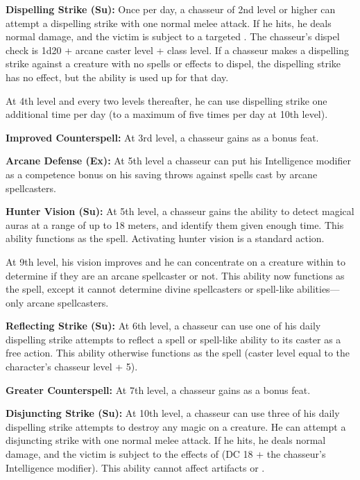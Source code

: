 {%


\textbf{Dispelling Strike (Su):} Once per day, a chasseur of 2nd level or higher can attempt a dispelling strike with one normal melee attack. If he hits, he deals normal damage, and the victim is subject to a targeted . The chasseur's dispel check is 1d20 + arcane caster level + class level. If a chasseur makes a dispelling strike against a creature with no spells or effects to dispel, the dispelling strike has no effect, but the ability is used up for that day.

At 4th level and every two levels thereafter, he can use dispelling strike one additional time per day (to a maximum of five times per day at 10th level).

\textbf{Improved Counterspell:} At 3rd level, a chasseur gains  as a bonus feat.

\textbf{Arcane Defense (Ex):} At 5th level a chasseur can put his Intelligence modifier as a competence bonus on his saving throws against spells cast by arcane spellcasters.

\textbf{Hunter Vision (Su):} At 5th level, a chasseur gains the ability to detect magical auras at a range of up to 18 meters, and identify them given enough time. This ability functions as the  spell. Activating hunter vision is a standard action.

At 9th level, his vision improves and he can concentrate on a creature within to determine if they are an arcane spellcaster or not. This ability now functions as the  spell, except it cannot determine divine spellcasters or spell-like abilities---only arcane spellcasters.

\textbf{Reflecting Strike (Su):} At 6th level, a chasseur can use one of his daily dispelling strike attempts to reflect a spell or spell-like ability to its caster as a free action. This ability otherwise functions as the  spell (caster level equal to the character's chasseur level + 5).

\textbf{Greater Counterspell:} At 7th level, a chasseur gains  as a bonus feat.

\textbf{Disjuncting Strike (Su):} At 10th level, a chasseur can use three of his daily dispelling strike attempts to destroy any magic on a creature. He can attempt a disjuncting strike with one normal melee attack. If he hits, he deals normal damage, and the victim is subject to the effects of  (DC 18 + the chasseur's Intelligence modifier). This ability cannot affect artifacts or .
}
